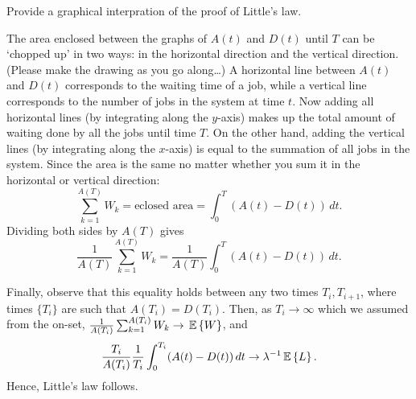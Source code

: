 \begin{question}
  Provide a graphical interpration of the proof of Little's law.
  \begin{solution}
    The area enclosed between the graphs of $A(t)$ and $D(t)$ until
    $T$ can be `chopped up' in two ways: in the horizontal direction
    and the vertical direction. (Please make the drawing as you go
    along\ldots) A horizontal line between $A(t)$ and $D(t)$
    corresponds to the waiting time of a job, while a vertical line
    corresponds to the number of jobs in the system at time $t$. Now
    adding all horizontal lines (by integrating along the $y$-axis)
    makes up the total amount of waiting done by all the jobs until
    time $T$. On the other hand, adding the vertical lines (by
    integrating along the $x$-axis) is equal to the summation of all
    jobs in the system. Since the area is the same no matter whether
    you sum it in the horizontal or vertical direction:
    \begin{equation*}
      \sum_{k=1}^{A(T)}  W_k = \text{eclosed area} = \int_0^T (A(t)-D(t))\,dt. 
    \end{equation*}
 Dividing both sides by $A(T)$ gives
    \begin{equation*}
\frac{1}{A(T)} \sum_{k=1}^{A(T)}  W_k =\frac{1}{A(T)} \int_0^T (A(t)-D(t))\,dt. 
    \end{equation*}

    Finally, observe that this equality holds between any two times
    $T_i, T_{i+1}$, where times $\{T_i\}$ are such that
    $A(T_i)=D(T_i)$. Then, as $T_i\to \infty$ which we assumed from
    the on-set, $\frac{1}{A(T_i)} \sum_{k=1}^{A(T_i)} W_k\to \,\mathbb{E}\left\{W\right\}$,
    and
    \begin{equation*}
\frac{T_i}{A(T_i)}\frac{1}{T_i} \int_0^{T_i} (A(t)-D(t))\,dt \to \lambda^{-1} \,\mathbb{E}\left\{L\right\}.
    \end{equation*}
Hence, Little's law follows.
  \end{solution}
\end{question}


